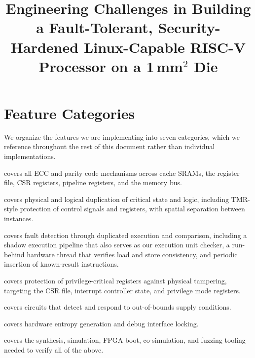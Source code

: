 \documentclass[12pt]{article}
\title{\textbf{Engineering Challenges in Building a Fault-Tolerant,
Security-Hardened Linux-Capable RISC-V Processor on a 1\,mm$^2$ Die}}
\author{}
\date{}
\begin{document}
\maketitle
\thispagestyle{empty}

\section*{Feature Categories}

We organize the features we are implementing into seven categories,
which we reference throughout the rest of this document rather than
individual implementations.

\begin{description}
  \setlength{\itemsep}{0.4em}

  \item[\textbf{Error Correction}]
    covers all ECC and parity code mechanisms across cache SRAMs, the
    register file, CSR registers, pipeline registers, and the memory bus.

  \item[\textbf{Redundancy}]
    covers physical and logical duplication of critical state and logic,
    including TMR-style protection of control signals and registers, with
    spatial separation between instances.

  \item[\textbf{Re-execution}]
    covers fault detection through duplicated execution and comparison,
    including a shadow execution pipeline that also serves as our
    execution unit checker, a run-behind hardware thread that verifies
    load and store consistency, and periodic insertion of known-result
    instructions.

  \item[\textbf{Architectural State Hardening}]
    covers protection of privilege-critical registers against physical
    tampering, targeting the CSR file, interrupt controller state, and
    privilege mode registers.

  \item[\textbf{Environmental and Power Hardening}]
    covers circuits that detect and respond to out-of-bounds supply
    conditions.

  \item[\textbf{Security Controls}]
    covers hardware entropy generation and debug interface locking.

  \item[\textbf{Validation Infrastructure}]
    covers the synthesis, simulation, FPGA boot, co-simulation, and
    fuzzing tooling needed to verify all of the above.
\end{description}
\end{document}
